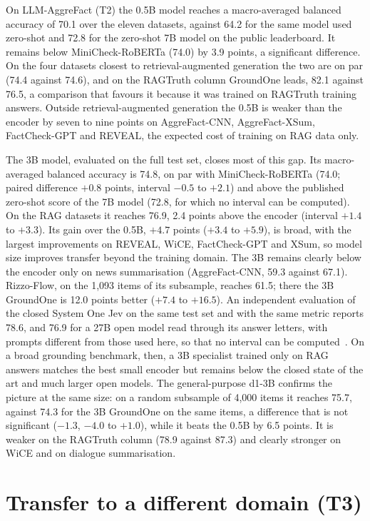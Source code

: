 On LLM-AggreFact (T2) the 0.5B model reaches a macro-averaged balanced accuracy of 70.1 over the eleven datasets,
against 64.2 for the same model used zero-shot and 72.8 for the zero-shot 7B model on the public leaderboard. It remains
below MiniCheck-RoBERTa (74.0) by 3.9 points, a significant difference. On the four datasets closest to
retrieval-augmented generation the two are on par (74.4 against 74.6), and on the RAGTruth column GroundOne leads, 82.1
against 76.5, a comparison that favours it because it was trained on RAGTruth training answers. Outside
retrieval-augmented generation the 0.5B is weaker than the encoder by seven to nine points on AggreFact-CNN,
AggreFact-XSum, FactCheck-GPT and REVEAL, the expected cost of training on RAG data only.

The 3B model, evaluated on the full test set, closes most of this gap. Its macro-averaged balanced accuracy is 74.8, on
par with MiniCheck-RoBERTa (74.0; paired difference $+0.8$ points, interval $-0.5$ to $+2.1$) and above the published
zero-shot score of the 7B model (72.8, for which no interval can be computed). On the RAG datasets it reaches 76.9, 2.4
points above the encoder (interval $+1.4$ to $+3.3$). Its gain over the 0.5B, $+4.7$ points ($+3.4$ to $+5.9$), is broad,
with the largest improvements on REVEAL, WiCE, FactCheck-GPT and XSum, so model size improves transfer beyond the
training domain. The 3B remains clearly below the encoder only on news summarisation (AggreFact-CNN, 59.3 against 67.1).
Rizzo-Flow, on the 1{,}093 items of its subsample, reaches 61.5; there the 3B GroundOne is 12.0 points better ($+7.4$ to
$+16.5$). An independent evaluation of the closed System One Jev on the same test set and with the same metric reports
78.6, and 76.9 for a 27B open model read through its answer letters, with prompts different from those used here, so that
no interval can be computed~\cite{deusser2026jev}. On a broad grounding benchmark, then, a 3B specialist trained only on
RAG answers matches the best small encoder but remains below the closed state of the art and much larger open models.
The general-purpose d1-3B confirms the picture at the same size: on a random subsample of 4{,}000 items it reaches 75.7,
against 74.3 for the 3B GroundOne on the same items, a difference that is not significant ($-1.3$, $-4.0$ to $+1.0$),
while it beats the 0.5B by 6.5 points. It is weaker on the RAGTruth column (78.9 against 87.3) and clearly stronger on
WiCE and on dialogue summarisation.

\section{Transfer to a different domain (T3)}
\label{sec:results-t3}

